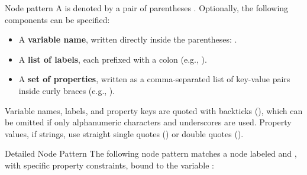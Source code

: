 \begin{definition}{Node pattern}
    A  is denoted by a pair of parentheses \code{()}. Optionally, the following components can be specified:
    \begin{itemize}
        \item A \textbf{variable name}, written directly inside the parentheses: .
        \item A \textbf{list of labels}, each prefixed with a colon \code{:} (e.g., ).
        \item A \textbf{set of properties}, written as a comma-separated list of key-value pairs inside curly braces \code{\{\}} (e.g., ).
    \end{itemize}
\end{definition}

\noindent
Variable names, labels, and property keys are quoted with backticks (), which can be omitted if only alphanumeric characters and underscores are used. Property values, if strings, use straight single quotes () or double quotes ().

\begin{example}{Detailed Node Pattern}
    The following node pattern matches a node labeled  and , with specific property constraints, bound to the variable :
    \begin{center}
    \end{center}
\end{example}

